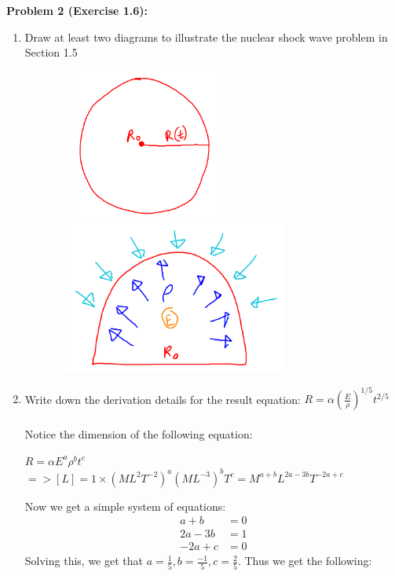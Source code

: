 \documentclass[11pt]{article}
\newenvironment{problem}[1]{\textbf{Problem #1: }}{\newpage}
\begin{document}
	\begin{problem}{2 (Exercise 1.6)}
		\begin{enumerate}[label = (\alph*)]
			\item Draw at least two diagrams to illustrate the nuclear shock wave problem in Section 1.5 
			\begin{figure}[h!]
				\centering
				\includegraphics[width=6cm, height = 5cm]{Photos/RadiusShockWave.png}
				\hspace{1cm}
				\includegraphics[width=8cm, height = 5cm]{Photos/Pressure.png}
			\end{figure}
			\item Write down the derivation details for the result equation: $R = \alpha \left(\frac{E}{\rho}\right)^{1/5}t^{2/5}$
			\\ \\
			Notice the dimension of the following equation:
			\begin{center}
				$R = \alpha E^{a}\rho^b t^c$ \\
				$=> [L] = 1 \times \left(ML^2T^{-2}\right)^a\left(ML^{-3}\right)^b T^c = M^{a+b}L^{2a-3b}T^{-2a+c}$
			\end{center}
			Now we get a simple system of equations:
			\begin{align*}
				a+b &= 0 \\
				2a-3b &= 1 \\
				-2a + c &= 0
			\end{align*}
			Solving this, we get that $a = \frac{1}{5}, b = \frac{-1}{5}, c = \frac{2}{5}$.  Thus we get the following:

\end{enumerate}
\end{problem}
\end{document}

